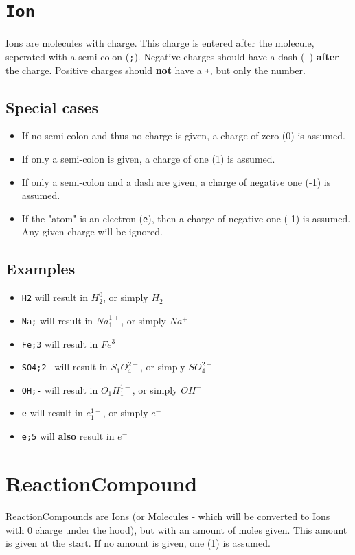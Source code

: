 \documentclass[11pt]{article}
\def\code#1{\texttt{#1}}
\begin{document}
\section{\code{Ion}}
Ions are molecules with charge. This charge is entered after the molecule, seperated with a semi-colon (\code{;}). Negative charges should have a dash (\code{-}) \textbf{after} the charge. Positive charges should \textbf{not} have a \code{+}, but only the number.

\subsection{Special cases}
\begin{itemize}
  \item{If no semi-colon and thus no charge is given, a charge of zero (0) is assumed.}
  \item{If only a semi-colon is given, a charge of one (1) is assumed.}
  \item{If only a semi-colon and a dash are given, a charge of negative one (-1) is assumed.}
  \item{If the "atom" is an electron (\code{e}), then a charge of negative one (-1) is assumed. Any given charge will be ignored.}
\end{itemize}

\subsection{Examples}
\begin{itemize}
  \item{\code{H2} will result in $H_2^0$, or simply $H_2$}
  \item{\code{Na;} will result in $Na_1^{1+}$, or simply $Na^+$}
  \item{\code{Fe;3} will result in $Fe^{3+}$}
  \item{\code{SO4;2-} will result in $S_1O_4^{2-}$, or simply $SO_4^{2-}$}
  \item{\code{OH;-} will result in $O_1H_1^{1-}$, or simply $OH^{-}$}
  \item{\code{e} will result in $e_1^{1-}$, or simply $e^-$}
  \item{\code{e;5} will \textbf{also} result in $e^-$}
\end{itemize}

\section{ReactionCompound}
ReactionCompounds are Ions (or Molecules - which will be converted to Ions with 0 charge under the hood), but with an amount of moles given. This amount is given at the start. If no amount is given, one (1) is assumed.
\end{document}

